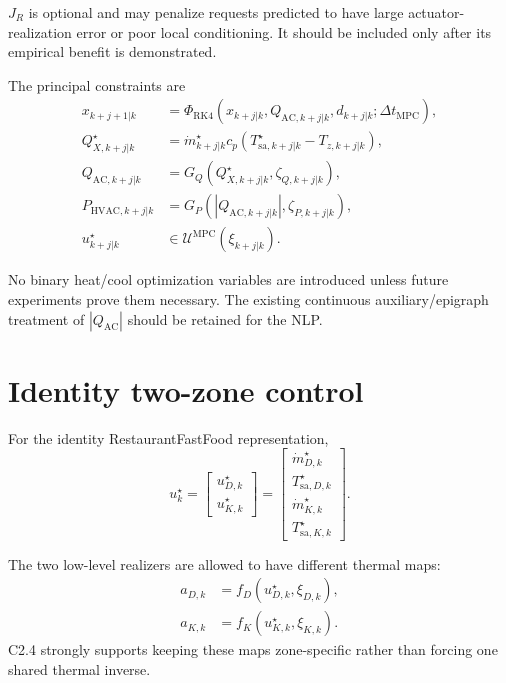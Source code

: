 \documentclass[11pt]{article}
\newcommand{\mdot}{\dot m}
\newcommand{\Qac}{Q_{\mathrm{AC}}}
\begin{document}
$J_R$ is optional and may penalize requests predicted to have large
actuator-realization error or poor local conditioning.  It should be included
only after its empirical benefit is demonstrated.

The principal constraints are
\begin{align}
x_{k+j+1|k}
&=
\Phi_{\mathrm{RK4}}
\left(
x_{k+j|k},
Q_{\mathrm{AC},k+j|k},
d_{k+j|k};
\Delta t_{\mathrm{MPC}}
\right),
\\
Q_{X,k+j|k}^{\star}
&=
\mdot_{k+j|k}^{\star}
c_p
\left(
T_{\mathrm{sa},k+j|k}^{\star}
-
T_{z,k+j|k}
\right),
\\
Q_{\mathrm{AC},k+j|k}
&=
G_Q
\left(
Q_{X,k+j|k}^{\star},
\zeta_{Q,k+j|k}
\right),
\\
P_{\mathrm{HVAC},k+j|k}
&=
G_P
\left(
|Q_{\mathrm{AC},k+j|k}|,
\zeta_{P,k+j|k}
\right),
\\
u_{k+j|k}^\star
&\in
\mathcal U^{\mathrm{MPC}}
\left(
\xi_{k+j|k}
\right).
\end{align}

No binary heat/cool optimization variables are introduced unless future
experiments prove them necessary.  The existing continuous auxiliary/epigraph
treatment of $|\Qac|$ should be retained for the NLP.

\section{Identity two-zone control}

For the identity RestaurantFastFood representation,
\begin{equation}
u_k^\star
=
\begin{bmatrix}
u_{D,k}^{\star}\\
u_{K,k}^{\star}
\end{bmatrix}
=
\begin{bmatrix}
\mdot_{D,k}^\star\\
T_{\mathrm{sa},D,k}^\star\\
\mdot_{K,k}^\star\\
T_{\mathrm{sa},K,k}^\star
\end{bmatrix}.
\label{eq:identity-control-vector}
\end{equation}

The two low-level realizers are allowed to have different thermal maps:
\begin{align}
a_{D,k}
&=
f_D(u_{D,k}^\star,\xi_{D,k}),
\\
a_{K,k}
&=
f_K(u_{K,k}^\star,\xi_{K,k}).
\end{align}
C2.4 strongly supports keeping these maps zone-specific rather than forcing one
shared thermal inverse.
\end{document}
